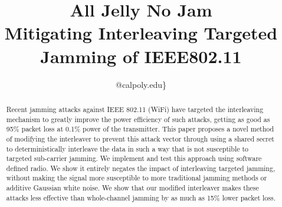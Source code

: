 \documentclass[sigconf, anonymous]{acmart}
\begin{document}
\title{All Jelly No Jam\\ {\large Mitigating Interleaving Targeted Jamming of IEEE802.11}}


\author{
@calpoly.edu\}}


\maketitle


\begin{abstract}
  Recent jamming attacks against IEEE 802.11 (WiFi) have targeted the interleaving mechanism to greatly improve the power efficiency of such attacks, getting as good as 95\% packet loss at 0.1\% power of the transmitter. This paper proposes a novel method of modifying the interleaver to prevent this attack vector through using a shared secret to deterministically interleave the data in such a way that is not susceptible to targeted sub-carrier jamming. We implement and test this approach using software defined radio. We show it entirely negates the impact of interleaving targeted jamming, without making the signal more susceptible to more traditional jamming methods or additive Gaussian white noise. We show that our modified interleaver makes these attacks less effective than whole-channel jamming by as much as 15\% lower packet loss.
\end{abstract}





\end{document}
